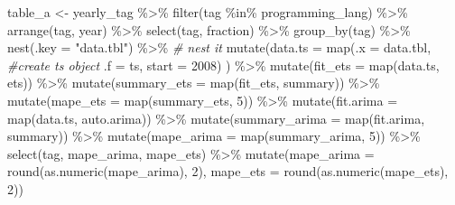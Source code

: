 \documentclass[
]{article}
\newenvironment{Shaded}{\begin{snugshade}}{\end{snugshade}}
\newcommand{\AttributeTok}[1]{\textcolor[rgb]{0.77,0.63,0.00}{#1}}
\newcommand{\CommentTok}[1]{\textcolor[rgb]{0.56,0.35,0.01}{\textit{#1}}}
\newcommand{\DecValTok}[1]{\textcolor[rgb]{0.00,0.00,0.81}{#1}}
\newcommand{\FunctionTok}[1]{\textcolor[rgb]{0.00,0.00,0.00}{#1}}
\newcommand{\NormalTok}[1]{#1}
\newcommand{\OtherTok}[1]{\textcolor[rgb]{0.56,0.35,0.01}{#1}}
\newcommand{\SpecialCharTok}[1]{\textcolor[rgb]{0.00,0.00,0.00}{#1}}
\newcommand{\StringTok}[1]{\textcolor[rgb]{0.31,0.60,0.02}{#1}}
\begin{document}
\begin{Shaded}
\begin{Highlighting}[]
\NormalTok{table\_a }\OtherTok{\textless{}{-}} 
\NormalTok{yearly\_tag  }\SpecialCharTok{\%\textgreater{}\%} 
  \FunctionTok{filter}\NormalTok{(tag }\SpecialCharTok{\%in\%}\NormalTok{ programming\_lang) }\SpecialCharTok{\%\textgreater{}\%}
  \FunctionTok{arrange}\NormalTok{(tag, year) }\SpecialCharTok{\%\textgreater{}\%}
  \FunctionTok{select}\NormalTok{(tag, fraction) }\SpecialCharTok{\%\textgreater{}\%} 
  \FunctionTok{group\_by}\NormalTok{(tag) }\SpecialCharTok{\%\textgreater{}\%} 
  \FunctionTok{nest}\NormalTok{(}\AttributeTok{.key =} \StringTok{"data.tbl"}\NormalTok{) }\SpecialCharTok{\%\textgreater{}\%} \CommentTok{\# nest it}
  \FunctionTok{mutate}\NormalTok{(}\AttributeTok{data.ts =} \FunctionTok{map}\NormalTok{(}\AttributeTok{.x    =}\NormalTok{ data.tbl, }\CommentTok{\#create ts object}
                       \AttributeTok{.f    =}\NormalTok{ ts,}
                       \AttributeTok{start =} \DecValTok{2008}\NormalTok{)}
\NormalTok{                       ) }\SpecialCharTok{\%\textgreater{}\%} 
  \FunctionTok{mutate}\NormalTok{(}\AttributeTok{fit\_ets =} \FunctionTok{map}\NormalTok{(data.ts, ets)) }\SpecialCharTok{\%\textgreater{}\%}
  \FunctionTok{mutate}\NormalTok{(}\AttributeTok{summary\_ets =} \FunctionTok{map}\NormalTok{(fit\_ets, summary)) }\SpecialCharTok{\%\textgreater{}\%}
  \FunctionTok{mutate}\NormalTok{(}\AttributeTok{mape\_ets =} \FunctionTok{map}\NormalTok{(summary\_ets, }\DecValTok{5}\NormalTok{)) }\SpecialCharTok{\%\textgreater{}\%} 
  \FunctionTok{mutate}\NormalTok{(}\AttributeTok{fit.arima =} \FunctionTok{map}\NormalTok{(data.ts, auto.arima)) }\SpecialCharTok{\%\textgreater{}\%}
  \FunctionTok{mutate}\NormalTok{(}\AttributeTok{summary\_arima =} \FunctionTok{map}\NormalTok{(fit.arima, summary)) }\SpecialCharTok{\%\textgreater{}\%}
  \FunctionTok{mutate}\NormalTok{(}\AttributeTok{mape\_arima =} \FunctionTok{map}\NormalTok{(summary\_arima, }\DecValTok{5}\NormalTok{)) }\SpecialCharTok{\%\textgreater{}\%} 
  \FunctionTok{select}\NormalTok{(tag, mape\_arima, mape\_ets) }\SpecialCharTok{\%\textgreater{}\%} 
  \FunctionTok{mutate}\NormalTok{(}\AttributeTok{mape\_arima =} \FunctionTok{round}\NormalTok{(}\FunctionTok{as.numeric}\NormalTok{(mape\_arima), }\DecValTok{2}\NormalTok{), }
         \AttributeTok{mape\_ets =} \FunctionTok{round}\NormalTok{(}\FunctionTok{as.numeric}\NormalTok{(mape\_ets), }\DecValTok{2}\NormalTok{)) }
\end{Highlighting}
\end{Shaded}
\end{document}

